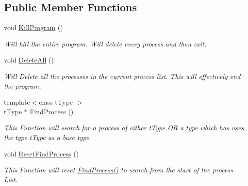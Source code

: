 \subsection*{Public Member Functions}
\begin{DoxyCompactItemize}
\item 
\hypertarget{classc_kernel_a721f5ad665c512b511ff8d344010385e}{
void \hyperlink{classc_kernel_a721f5ad665c512b511ff8d344010385e}{KillProgram} ()}
\label{classc_kernel_a721f5ad665c512b511ff8d344010385e}

\begin{DoxyCompactList}\small\item\em Will kill the entire program. Will delete every process and then exit. \end{DoxyCompactList}\item 
\hypertarget{classc_kernel_af4c3e32a55fdef58236378eed46afdfe}{
void \hyperlink{classc_kernel_af4c3e32a55fdef58236378eed46afdfe}{DeleteAll} ()}
\label{classc_kernel_af4c3e32a55fdef58236378eed46afdfe}

\begin{DoxyCompactList}\small\item\em Will Delete all the processes in the current process list. This will effectively end the program. \end{DoxyCompactList}\item 
{\footnotesize template$<$class tType $>$ }\\tType $\ast$ \hyperlink{classc_kernel_a56083c090177a8a2a9bb50ad58e712c3}{FindProcess} ()
\begin{DoxyCompactList}\small\item\em This Function will search for a process of either tType OR a type which has uses the type tType as a base type. \end{DoxyCompactList}\item 
\hypertarget{classc_kernel_a42d5d224af7acfe4aee27b7cee2b0a02}{
void \hyperlink{classc_kernel_a42d5d224af7acfe4aee27b7cee2b0a02}{ResetFindProcess} ()}
\label{classc_kernel_a42d5d224af7acfe4aee27b7cee2b0a02}

\begin{DoxyCompactList}\small\item\em This Function will reset \hyperlink{classc_kernel_a56083c090177a8a2a9bb50ad58e712c3}{FindProcess()} to search from the start of the process List. \end{DoxyCompactList}\end{DoxyCompactItemize}
